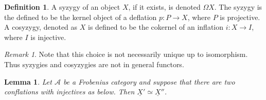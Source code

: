\documentclass[11pt]{article}
\newtheorem{lemma}[theorem]{Lemma}
\theoremstyle{definition}
\newtheorem{definition}{Definition}[section]
\theoremstyle{remark}
\newtheorem*{remark}{Remark}
\newcommand{\upside}[1]{\rotatebox[origin=c]{180}{#1}}
\begin{document}
            \begin{definition}
                A syzygy of an object $X$, if it exists, is denoted $\Omega X$. The syzygy is the defined to be the kernel object of a deflation $p:P\rightarrow X$, where $P$ is projective. A cosyzygy, denoted as \upside{$\Omega$}$X$ is defined to be the cokernel of an inflation $i:X\rightarrow I$, where $I$ is injective.
            \end{definition}

            \begin{remark}
                Note that this choice is not necessarily unique up to isomorphism. Thus syzygies and cosyzygies are not in general functors.
            \end{remark}

            \begin{lemma}
                Let $\mathcal{A}$ be a Frobenius category and suppose that there are two conflations with injectives as below. Then $\underline{X}'\simeq\underline{X}''$.
                \begin{center}
                \end{center}
            \end{lemma}
\end{document}
